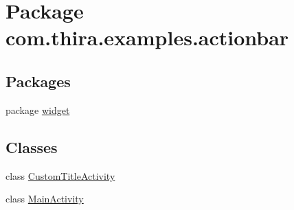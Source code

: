 \hypertarget{namespacecom_1_1thira_1_1examples_1_1actionbar}{\section{Package com.\-thira.\-examples.\-actionbar}
\label{namespacecom_1_1thira_1_1examples_1_1actionbar}
}
\subsection*{Packages}
\begin{DoxyCompactItemize}
\item 
package \hyperlink{namespacecom_1_1thira_1_1examples_1_1actionbar_1_1widget}{widget}
\end{DoxyCompactItemize}
\subsection*{Classes}
\begin{DoxyCompactItemize}
\item 
class \hyperlink{classcom_1_1thira_1_1examples_1_1actionbar_1_1_custom_title_activity}{Custom\-Title\-Activity}
\item 
class \hyperlink{classcom_1_1thira_1_1examples_1_1actionbar_1_1_main_activity}{Main\-Activity}
\end{DoxyCompactItemize}
